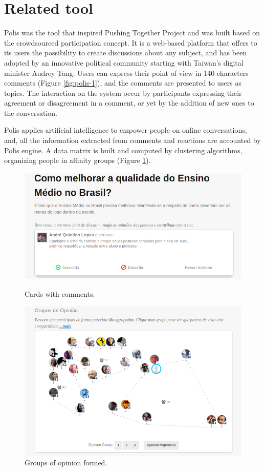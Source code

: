 \documentclass{llncs}
\begin{document}
\section{Related tool}

Polis was the tool that inspired Pushing Together Project and
was built based on the crowdsourced participation concept. It
is a web-based platform that offers to its users the possibility to
create discussions about any subject, and has been adopted by an
innovative political community starting with Taiwan's digital minister
Audrey Tang. Users can express their point of view in
140 characters comments (Figure \ref{fig:polis-1}), and the comments are presented
to users as topics. The interaction on the system occur by
participants expressing their agreement or disagreement in a comment, or yet by
the addition of new ones to the conversation.

Polis applies artificial intelligence to empower people on online conversations,
and, all the information extracted from comments and reactions are accounted by
Polis engine. A data matrix is built and computed by clustering algorithms,
organizing people in affinity groups (Figure \ref{fig:polis-2}).

 \begin{figure}[hbt]
   \centering
   \begin{minipage}{.50\textwidth}
     \includegraphics[width=.9\linewidth]{images/polis1.png}
     \caption{Cards with comments.}
     \label{fig:polis-1}
   \end{minipage}
   \begin{minipage}{.49\textwidth}
     \includegraphics[width=.9\linewidth]{images/polis2.png}
     \caption{Groups of opinion formed.}
     \label{fig:polis-2}
   \end{minipage}
 \end{figure}
\end{document}
